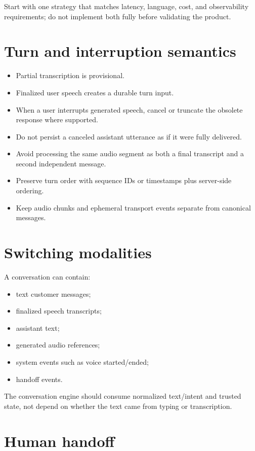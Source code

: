 Start with one strategy that matches latency, language, cost, and observability requirements; do not implement both fully before validating the product.

\section{Turn and interruption semantics}

\begin{itemize}
\item Partial transcription is provisional.
\item Finalized user speech creates a durable turn input.
\item When a user interrupts generated speech, cancel or truncate the obsolete response where supported.
\item Do not persist a canceled assistant utterance as if it were fully delivered.
\item Avoid processing the same audio segment as both a final transcript and a second independent message.
\item Preserve turn order with sequence IDs or timestamps plus server-side ordering.
\item Keep audio chunks and ephemeral transport events separate from canonical messages.
\end{itemize}
\section{Switching modalities}

A conversation can contain:

\begin{itemize}
\item text customer messages;
\item finalized speech transcripts;
\item assistant text;
\item generated audio references;
\item system events such as voice started/ended;
\item handoff events.
\end{itemize}
The conversation engine should consume normalized text/intent and trusted state, not depend on whether the text came from typing or transcription.

\section{Human handoff}

